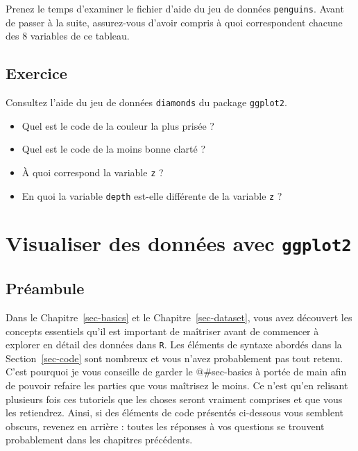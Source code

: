 \documentclass[
  a4paper,
  DIV=11,
  numbers=noendperiod,
  oneside]{scrreprt}
\providecommand{\tightlist}{%
  \setlength{\itemsep}{0pt}\setlength{\parskip}{0pt}}\usepackage{longtable,booktabs,array}
\begin{document}
Prenez le temps d'examiner le fichier d'aide du jeu de données
\texttt{penguins}. Avant de passer à la suite, assurez-vous d'avoir
compris à quoi correspondent chacune des 8 variables de ce tableau.

\section{Exercice}\label{sec-exo-2}

Consultez l'aide du jeu de données \texttt{diamonds} du package
\texttt{ggplot2}.

\begin{itemize}
\tightlist
\item
  Quel est le code de la couleur la plus prisée ?
\item
  Quel est le code de la moins bonne clarté ?
\item
  À quoi correspond la variable \texttt{z} ?
\item
  En quoi la variable \texttt{depth} est-elle différente de la variable
  \texttt{z} ?
\end{itemize}


\chapter{\texorpdfstring{Visualiser des données avec
\texttt{ggplot2}}{Visualiser des données avec ggplot2}}\label{sec-viz}

\section{Préambule}\label{pruxe9ambule-2}

Dans le Chapitre~\ref{sec-basics} et le Chapitre~\ref{sec-dataset}, vous
avez découvert les concepts essentiels qu'il est important de maîtriser
avant de commencer à explorer en détail des données dans \texttt{R}. Les
éléments de syntaxe abordés dans la Section~\ref{sec-code} sont nombreux
et vous n'avez probablement pas tout retenu. C'est pourquoi je vous
conseille de garder le @\#sec-basics à portée de main afin de pouvoir
refaire les parties que vous maîtrisez le moins. Ce n'est qu'en relisant
plusieurs fois ces tutoriels que les choses seront vraiment comprises et
que vous les retiendrez. Ainsi, si des éléments de code présentés
ci-dessous vous semblent obscurs, revenez en arrière : toutes les
réponses à vos questions se trouvent probablement dans les chapitres
précédents.
\end{document}

